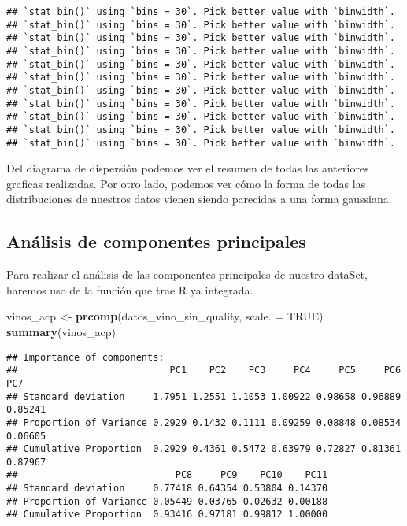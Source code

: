 \documentclass[
]{article}
\newenvironment{Shaded}{\begin{snugshade}}{\end{snugshade}}
\newcommand{\AttributeTok}[1]{\textcolor[rgb]{0.13,0.29,0.53}{#1}}
\newcommand{\ConstantTok}[1]{\textcolor[rgb]{0.56,0.35,0.01}{#1}}
\newcommand{\FunctionTok}[1]{\textcolor[rgb]{0.13,0.29,0.53}{\textbf{#1}}}
\newcommand{\NormalTok}[1]{#1}
\newcommand{\OtherTok}[1]{\textcolor[rgb]{0.56,0.35,0.01}{#1}}
\begin{document}
\begin{verbatim}
## `stat_bin()` using `bins = 30`. Pick better value with `binwidth`.
## `stat_bin()` using `bins = 30`. Pick better value with `binwidth`.
## `stat_bin()` using `bins = 30`. Pick better value with `binwidth`.
## `stat_bin()` using `bins = 30`. Pick better value with `binwidth`.
## `stat_bin()` using `bins = 30`. Pick better value with `binwidth`.
## `stat_bin()` using `bins = 30`. Pick better value with `binwidth`.
## `stat_bin()` using `bins = 30`. Pick better value with `binwidth`.
## `stat_bin()` using `bins = 30`. Pick better value with `binwidth`.
## `stat_bin()` using `bins = 30`. Pick better value with `binwidth`.
## `stat_bin()` using `bins = 30`. Pick better value with `binwidth`.
## `stat_bin()` using `bins = 30`. Pick better value with `binwidth`.
\end{verbatim}

Del diagrama de dispersión podemos ver el resumen de todas las
anteriores graficas realizadas. Por otro lado, podemos ver cómo la forma
de todas las distribuciones de nuestros datos vienen siendo parecidas a
una forma gaussiana.

\hypertarget{anuxe1lisis-de-componentes-principales}{%
\subsection{Análisis de componentes
principales}\label{anuxe1lisis-de-componentes-principales}}

Para realizar el análisis de las componentes principales de nuestro
dataSet, haremos uso de la función que trae R ya integrada.

\begin{Shaded}
\begin{Highlighting}[]
\NormalTok{vinos\_acp }\OtherTok{\textless{}{-}} \FunctionTok{prcomp}\NormalTok{(datos\_vino\_sin\_quality, }\AttributeTok{scale. =} \ConstantTok{TRUE}\NormalTok{)}
\FunctionTok{summary}\NormalTok{(vinos\_acp)}
\end{Highlighting}
\end{Shaded}

\begin{verbatim}
## Importance of components:
##                           PC1    PC2    PC3     PC4     PC5     PC6     PC7
## Standard deviation     1.7951 1.2551 1.1053 1.00922 0.98658 0.96889 0.85241
## Proportion of Variance 0.2929 0.1432 0.1111 0.09259 0.08848 0.08534 0.06605
## Cumulative Proportion  0.2929 0.4361 0.5472 0.63979 0.72827 0.81361 0.87967
##                            PC8     PC9    PC10    PC11
## Standard deviation     0.77418 0.64354 0.53804 0.14370
## Proportion of Variance 0.05449 0.03765 0.02632 0.00188
## Cumulative Proportion  0.93416 0.97181 0.99812 1.00000
\end{verbatim}
\end{document}
